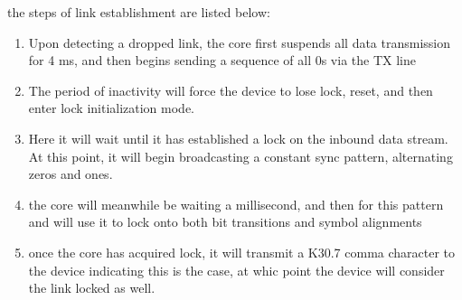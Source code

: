 the steps of link establishment are listed below: 

\begin{enumerate}
\item  Upon  detecting a  dropped link, the  core first suspends  all data
transmission for  4 ms, and then  begins sending a sequence  of all 0s
via the TX line
\item The period of inactivity will force the device to lose lock, reset,
and then enter lock initialization mode.
\item Here it will wait until it has established a lock on the inbound
data stream. At this point, it will begin broadcasting a constant sync
pattern, alternating zeros and ones.
\item the core will meanwhile be waiting a millisecond, and then for this
pattern and will use it to lock onto both bit transitions and symbol
alignments
\item once the core has acquired lock, it will transmit a K30.7 comma
character to the device indicating this is the case, at whic point the
device will consider the link locked as well.
\end{enumerate}
